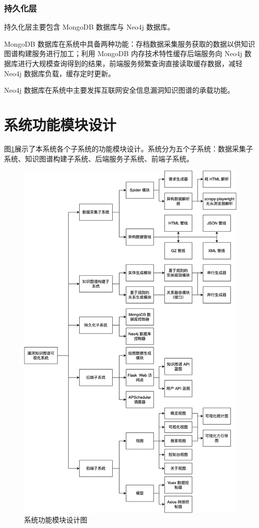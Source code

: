 \documentclass[a4paper,AutoFakeBold,oneside,12pt]{book}
\begin{document}
\subsubsection{持久化层}

持久化层主要包含 MongoDB 数据库与 Neo4j 数据库。

MongoDB 数据库在系统中具备两种功能：存档数据采集服务获取的数据以供知识图谱构建服务进行加工；利用 MongoDB 内存技术特性缓存后端服务向 Neo4j 数据库进行大规模查询得到的结果，前端服务频繁查询直接读取缓存数据，减轻 Neo4j 数据库负载，缓存定时更新。

Neo4j 数据库在系统中主要发挥互联网安全信息漏洞知识图谱的承载功能。

\section{系统功能模块设计}

图\ref{CyKG_OrgChart}展示了本系统各个子系统的功能模块设计。系统分为五个子系统：数据采集子系统、知识图谱构建子系统、后端服务子系统、前端子系统。

\begin{figure}
	\includegraphics[height=0.97\textheight]{pictures/CyKG_OrgChart-中文.png}
	\caption{系统功能模块设计图}
	\label{CyKG_OrgChart}
\end{figure}
\end{document}
